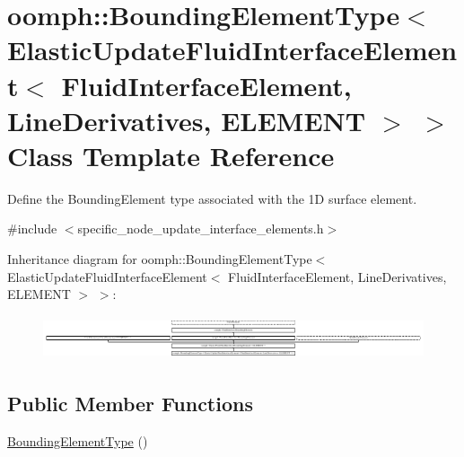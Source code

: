 \hypertarget{classoomph_1_1BoundingElementType_3_01ElasticUpdateFluidInterfaceElement_3_01FluidInterfaceEleme25258208c656cd18bb5e78a946d0c1ca}{}\section{oomph\+:\+:Bounding\+Element\+Type$<$ Elastic\+Update\+Fluid\+Interface\+Element$<$ Fluid\+Interface\+Element, Line\+Derivatives, E\+L\+E\+M\+E\+NT $>$ $>$ Class Template Reference}
\label{classoomph_1_1BoundingElementType_3_01ElasticUpdateFluidInterfaceElement_3_01FluidInterfaceEleme25258208c656cd18bb5e78a946d0c1ca}


Define the Bounding\+Element type associated with the 1D surface element.  




{\ttfamily \#include $<$specific\+\_\+node\+\_\+update\+\_\+interface\+\_\+elements.\+h$>$}

Inheritance diagram for oomph\+:\+:Bounding\+Element\+Type$<$ Elastic\+Update\+Fluid\+Interface\+Element$<$ Fluid\+Interface\+Element, Line\+Derivatives, E\+L\+E\+M\+E\+NT $>$ $>$\+:\begin{figure}[H]
\begin{center}
\leavevmode
\includegraphics[height=1.296296cm]{classoomph_1_1BoundingElementType_3_01ElasticUpdateFluidInterfaceElement_3_01FluidInterfaceEleme25258208c656cd18bb5e78a946d0c1ca}
\end{center}
\end{figure}
\subsection*{Public Member Functions}
\begin{DoxyCompactItemize}
\item 
\hyperlink{classoomph_1_1BoundingElementType_3_01ElasticUpdateFluidInterfaceElement_3_01FluidInterfaceEleme25258208c656cd18bb5e78a946d0c1ca_a3b2358d710986e238d7e4e5291bc0d1b}{Bounding\+Element\+Type} ()
\end{DoxyCompactItemize}
